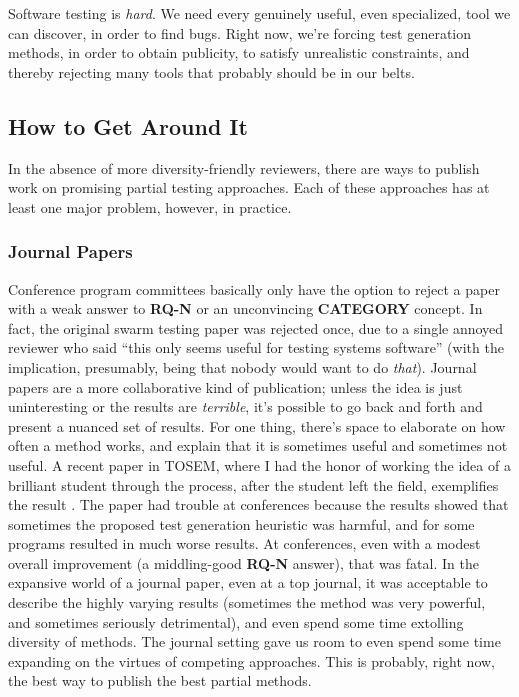 \documentclass[sigplan,screen]{acmart}
\begin{document}
Software testing is \emph{hard}.  We need every genuinely useful, even
specialized, tool we can discover, in order to find bugs.  Right now,
we're forcing test generation methods, in order to obtain publicity,
to satisfy unrealistic constraints, and thereby rejecting many tools
that probably should be in our belts.

\subsection{How to Get Around It}

In the absence of more diversity-friendly reviewers, there are ways to
publish work on promising partial testing approaches.  Each of these
approaches has at least one major problem, however, in practice.

\subsubsection{Journal Papers}

Conference program committees basically only have the option to reject
a paper with a weak answer to {\bf RQ-N} or an unconvincing {\bf
  CATEGORY} concept.  In fact, the original swarm testing paper was
rejected once, due to a single annoyed reviewer who said ``this only seems useful for
testing systems software'' (with the implication, presumably, being
that nobody would want to do \emph{that}).  Journal papers are a more
collaborative kind of publication; unless the idea is just
uninteresting or the results are \emph{terrible}, it's possible to go
back and forth and present a nuanced set of results.  For one thing,
there's space to elaborate on how often a method works, and explain
that it is sometimes useful and sometimes not useful.  A recent paper
in TOSEM, where I had the honor of working the idea of a brilliant
student through the process, after the student left the field,
exemplifies the result \cite{HolmesLOC}.  The paper had trouble at
conferences because the results showed that sometimes the proposed
test generation heuristic was harmful, and for some programs resulted
in much worse results.  At conferences, even with a modest overall
improvement (a middling-good {\bf RQ-N} answer), that was fatal.  In
the expansive world of a journal paper, even at a top journal, it was
acceptable to describe the highly varying results (sometimes the
method was very powerful, and sometimes seriously detrimental), and
even spend some time extolling diversity of methods.  The journal
setting gave us room to even spend some time expanding on the virtues
of competing approaches.  This is probably, right now, the best way to
publish the best partial methods.
\end{document}
